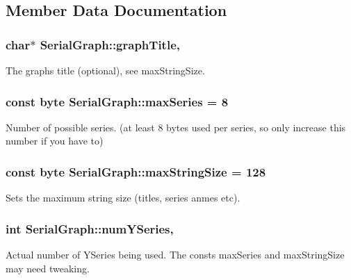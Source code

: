 \subsection{Member Data Documentation}
\hypertarget{class_serial_graph_a0b33d43c2bb54340ef1f90b5f76d7aea}{}
\subsubsection[{graph\+Title}]{\setlength{\rightskip}{0pt plus 5cm}char$\ast$ Serial\+Graph\+::graph\+Title\hspace{0.3cm}{\ttfamily [protected]}, {\ttfamily [inherited]}}\label{class_serial_graph_a0b33d43c2bb54340ef1f90b5f76d7aea}
The graphs title (optional), see max\+String\+Size. \hypertarget{class_serial_graph_a752a1429bd35687163fe11c5a2562bef}{}
\subsubsection[{max\+Series}]{\setlength{\rightskip}{0pt plus 5cm}const byte Serial\+Graph\+::max\+Series = 8\hspace{0.3cm}{\ttfamily [inherited]}}\label{class_serial_graph_a752a1429bd35687163fe11c5a2562bef}
Number of possible series. (at least 8 bytes used per series, so only increase this number if you have to) \hypertarget{class_serial_graph_a1867ab3a93268646490fa7ba4f8b5680}{}
\subsubsection[{max\+String\+Size}]{\setlength{\rightskip}{0pt plus 5cm}const byte Serial\+Graph\+::max\+String\+Size = 128\hspace{0.3cm}{\ttfamily [inherited]}}\label{class_serial_graph_a1867ab3a93268646490fa7ba4f8b5680}
Sets the maximum string size (titles, series anmes etc). \hypertarget{class_serial_graph_ab40c430e06102b9624736173d4a58596}{}
\subsubsection[{num\+Y\+Series}]{\setlength{\rightskip}{0pt plus 5cm}int Serial\+Graph\+::num\+Y\+Series\hspace{0.3cm}{\ttfamily [protected]}, {\ttfamily [inherited]}}\label{class_serial_graph_ab40c430e06102b9624736173d4a58596}
Actual number of Y\+Series being used. The consts max\+Series and max\+String\+Size may need tweaking. \hypertarget{class_serial_graph_aec32289a9393e98bf80d44406e5c207d}{}
